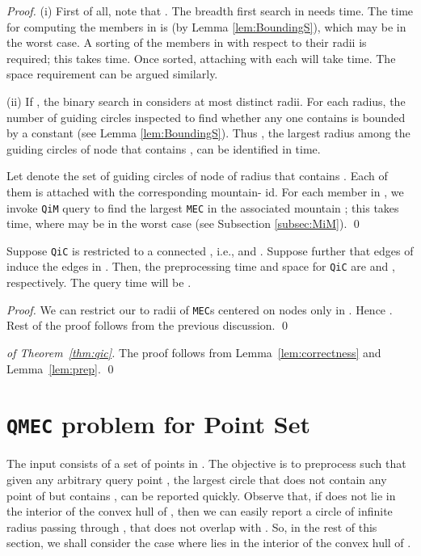 \documentclass[12pt]{llncs}
\begin{document}
\begin{proof}
(i) First of all, note that . The breadth first search in  needs 
 time. The time for computing 
the members in  is  
(by Lemma \ref{lem:BoundingS}), which may be  in the worst case. 
A sorting of the members in  with respect to their radii is required; this takes 
 time. Once sorted, attaching  with each  will 
take  time. The space requirement can be argued similarly.

(ii)  If , the binary search in  considers at most 
 distinct radii. For each radius, the number of guiding 
circles inspected to find whether any one contains  is bounded by a constant 
(see Lemma \ref{lem:BoundingS}). Thus , the largest radius among the guiding 
circles of node  that contains , can be identified in  time.

Let  denote the set of guiding circles of node  of radius 
 that contains . Each of them is attached with the corresponding mountain-
id. 
For each member in , we invoke {\tt QiM} query to find the 
largest {\tt MEC} in the associated mountain ; this takes  time, 
where  may be  in the worst case (see Subsection \ref{subsec:MiM}).  
\qed
\end{proof}

\begin{corollary} \label{cor:mstar}
Suppose {\tt QiC} is restricted to a connected , i.e.,  
and . Suppose further that  edges of  induce the edges 
in . Then, the preprocessing time and space for {\tt QiC} are  and 
, respectively. The query time will be .
\end{corollary}
\begin{proof}
We can restrict our  to radii of {\tt MEC}s centered on nodes only in . 
Hence . 
Rest of the proof follows from the previous discussion.
\qed
\end{proof}

\begin{proof}[of Theorem\ \ref{thm:qic}]
The proof follows from Lemma\ \ref{lem:correctness} and Lemma\ \ref{lem:prep}.
\qed
\end{proof}

\section{{\tt QMEC} problem for Point Set}
\label{sec:QMEC}
The input consists of a set of points  in 
. The objective is to preprocess  such that given any 
arbitrary query point , the largest circle  that
does not contain any point of  but contains , can be reported 
quickly. Observe that, if  does not lie in the interior of the convex 
hull of , then we can easily report a circle of infinite radius passing 
through , that does not overlap with . So, in the rest of this section, 
we shall consider the case where  lies in the  interior of the convex 
hull of . 
\end{document}
